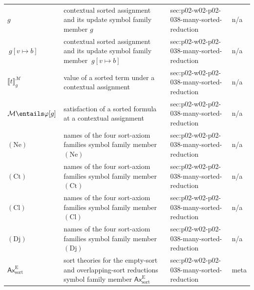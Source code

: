 \begin{longtable}{@{}p{}p{}p{}p{}@{}}
\(g\) & contextual sorted assignment and its update symbol family member \(g\) & sec:\allowbreak{}p02-\allowbreak{}w02-\allowbreak{}p02-\allowbreak{}038-\allowbreak{}many-\allowbreak{}sorted-\allowbreak{}reduction & n/a \\
\(\ g[v\mapsto b]\) & contextual sorted assignment and its update symbol family member \(\ g[v\mapsto b]\) & sec:\allowbreak{}p02-\allowbreak{}w02-\allowbreak{}p02-\allowbreak{}038-\allowbreak{}many-\allowbreak{}sorted-\allowbreak{}reduction & n/a \\
\(\llbracket t\rrbracket^{\mathcal M}_{g}\) & value of a sorted term under a contextual assignment & sec:\allowbreak{}p02-\allowbreak{}w02-\allowbreak{}p02-\allowbreak{}038-\allowbreak{}many-\allowbreak{}sorted-\allowbreak{}reduction & n/a \\
\(\mathcal M\entails\varphi[g]\) & satisfaction of a sorted formula at a contextual assignment & sec:\allowbreak{}p02-\allowbreak{}w02-\allowbreak{}p02-\allowbreak{}038-\allowbreak{}many-\allowbreak{}sorted-\allowbreak{}reduction & n/a \\
\((\mathrm{Ne})\) & names of the four sort-axiom families symbol family member \((\mathrm{Ne})\) & sec:\allowbreak{}p02-\allowbreak{}w02-\allowbreak{}p02-\allowbreak{}038-\allowbreak{}many-\allowbreak{}sorted-\allowbreak{}reduction & n/a \\
\((\mathrm{Ct})\) & names of the four sort-axiom families symbol family member \((\mathrm{Ct})\) & sec:\allowbreak{}p02-\allowbreak{}w02-\allowbreak{}p02-\allowbreak{}038-\allowbreak{}many-\allowbreak{}sorted-\allowbreak{}reduction & n/a \\
\((\mathrm{Cl})\) & names of the four sort-axiom families symbol family member \((\mathrm{Cl})\) & sec:\allowbreak{}p02-\allowbreak{}w02-\allowbreak{}p02-\allowbreak{}038-\allowbreak{}many-\allowbreak{}sorted-\allowbreak{}reduction & n/a \\
\((\mathrm{Dj})\) & names of the four sort-axiom families symbol family member \((\mathrm{Dj})\) & sec:\allowbreak{}p02-\allowbreak{}w02-\allowbreak{}p02-\allowbreak{}038-\allowbreak{}many-\allowbreak{}sorted-\allowbreak{}reduction & n/a \\
\(\mathsf{Ax}^{\mathrm E}_{\mathrm{sort}}\) & sort theories for the empty-sort and overlapping-sort reductions symbol family member \(\mathsf{Ax}^{\mathrm E}_{\mathrm{sort}}\) & sec:\allowbreak{}p02-\allowbreak{}w02-\allowbreak{}p02-\allowbreak{}038-\allowbreak{}many-\allowbreak{}sorted-\allowbreak{}reduction & meta \\

\end{longtable}
